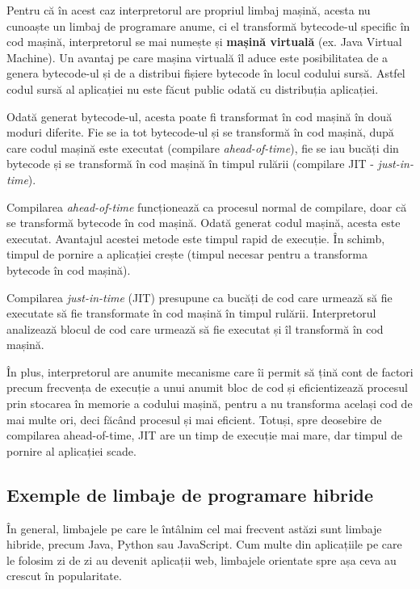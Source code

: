 Pentru că în acest caz interpretorul are propriul limbaj mașină, acesta nu cunoaște un limbaj de programare anume, ci el transformă bytecode-ul specific în cod mașină, interpretorul se mai numește și \textbf{mașină virtuală} (ex. Java Virtual Machine).
Un avantaj pe care mașina virtuală îl aduce este posibilitatea de a genera bytecode-ul și de a distribui fișiere bytecode în locul codului sursă.
Astfel codul sursă al aplicației nu este făcut public odată cu distribuția aplicației.

Odată generat bytecode-ul, acesta poate fi transformat în cod mașină în două moduri diferite.
Fie se ia tot bytecode-ul și se transformă în cod mașină, după care codul mașină este executat (compilare \textit{ahead-of-time}), fie se iau bucăți din bytecode și se transformă în cod mașină în timpul rulării (compilare JIT - \textit{just-in-time}).

Compilarea \textit{ahead-of-time} funcționează ca procesul normal de compilare, doar că se transformă bytecode în cod mașină.
Odată generat codul mașină, acesta este executat.
Avantajul acestei metode este timpul rapid de execuție.
În schimb, timpul de pornire a aplicației crește (timpul necesar pentru a transforma bytecode în cod mașină).

Compilarea \textit{just-in-time} (JIT) presupune ca bucăți de cod care urmează să fie executate să fie transformate în cod mașină în timpul rulării.
Interpretorul analizează blocul de cod care urmează să fie executat și îl transformă în cod mașină.

În plus, interpretorul are anumite mecanisme care îi permit să țină cont de factori precum frecvența de execuție a unui anumit bloc de cod și eficientizează procesul prin stocarea în memorie a codului mașină, pentru a nu transforma același cod de mai multe ori, deci făcând procesul și mai eficient.
Totuși, spre deosebire de compilarea ahead-of-time, JIT are un timp de execuție mai mare, dar timpul de pornire al aplicației scade.

\subsection{Exemple de limbaje de programare hibride}
\label{sec:appdev:hybrid-lang:ex}

În general, limbajele pe care le întâlnim cel mai frecvent astăzi sunt limbaje hibride, precum Java, Python sau JavaScript.
Cum multe din aplicațiile pe care le folosim zi de zi au devenit aplicații web, limbajele orientate spre așa ceva au crescut în popularitate.

